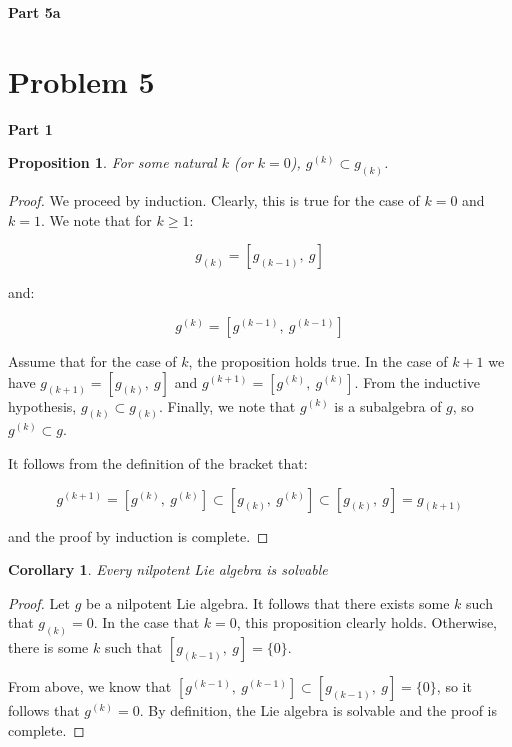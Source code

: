\documentclass[10pt, oneside]{article}
\newtheorem{cor}{Corollary}
\newtheorem{prop}{Proposition}
\begin{document}
    \textbf{Part 5a}
    \newline

    \section{Problem 5}

    \textbf{Part 1}

    \begin{prop}
      For some natural $k$ (or $k = 0$), $g^{(k)} \subset g_{(k)}$.
    \end{prop}

    \begin{proof}
      We proceed by induction. Clearly, this is true for the case of $k = 0$ and $k = 1$. We note that for $k \geq 1$:

      $$g_{(k)} = [g_{(k - 1)}, \ g]$$

      and:

      $$g^{(k)} = [g^{(k - 1)}, \ g^{(k - 1)}]$$

      Assume that for the case of $k$, the proposition holds true. In the case of $k + 1$ we have $g_{(k + 1)} = [g_{(k)}, \ g]$ and
      $g^{(k + 1)} = [g^{(k)}, \ g^{(k)}]$. From the inductive hypothesis, $g_{(k)} \subset g_{(k)}$. Finally, we note that $g^{(k)}$ is a subalgebra of $g$, so $g^{(k)} \subset g$.
      \newline

      It follows from the definition of the bracket that:

      $$g^{(k + 1)} = [g^{(k)}, \ g^{(k)}] \subset [g_{(k)}, \ g^{(k)}] \subset [g_{(k)}, \ g] = g_{(k + 1)}$$

      and the proof by induction is complete.
      \end{proof}

    \begin{cor}
      Every nilpotent Lie algebra is solvable
    \end{cor}

    \begin{proof}
      Let $g$ be a nilpotent Lie algebra. It follows that there exists some $k$ such that $g_{(k)} = 0$. In the case that $k = 0$, this
      proposition clearly holds. Otherwise, there is some $k$ such that $[g_{(k - 1)}, \ g] = \{0\}$.
      \newline

      From above, we know that $[g^{(k - 1)}, \ g^{(k - 1)}] \subset [g_{(k - 1)}, \ g] = \{0\}$, so it follows that $g^{(k)} = 0$. By definition,
      the Lie algebra is solvable and the proof is complete.
    \end{proof}
\end{document}
